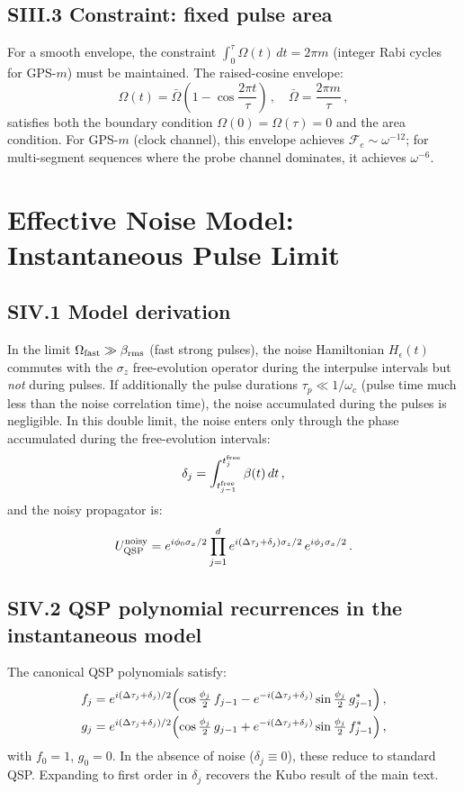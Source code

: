 \documentclass[aps,pra,twocolumn,superscriptaddress,longbibliography]{revtex4-2}
\newcommand{\be}{\begin{equation}}
\newcommand{\ee}{\end{equation}}
\begin{document}
\subsection*{SIII.3 Constraint: fixed pulse area}

For a smooth envelope, the constraint $\int_0^{\tau}\Omega(t)\,dt = 2\pi m$ (integer
Rabi cycles for GPS-$m$) must be maintained.  The raised-cosine envelope:
\be
  \Omega(t) = \bar\Omega\left(1 - \cos\frac{2\pi t}{\tau}\right)\,,\quad
  \bar\Omega = \frac{2\pi m}{\tau}\,,
\ee
satisfies both the boundary condition $\Omega(0)=\Omega(\tau)=0$ and the area condition.
For GPS-$m$ (clock channel), this envelope achieves $\mathcal{F}_e\sim\omega^{-12}$;
for multi-segment sequences where the probe channel dominates, it achieves $\omega^{-6}$.


\section{Effective Noise Model: Instantaneous Pulse Limit}
\label{supp:effective_model}

\subsection*{SIV.1 Model derivation}

In the limit $\Omega_{\rm fast} \gg \beta_{\rm rms}$ (fast strong pulses), the noise Hamiltonian
$H_\epsilon(t)$ commutes with the $\sigma_z$ free-evolution operator during the
interpulse intervals but \emph{not} during pulses.
If additionally the pulse durations $\tau_p \ll 1/\omega_c$ (pulse time much less than
the noise correlation time), the noise accumulated during the pulses is negligible.
In this double limit, the noise enters only through the phase accumulated during the
free-evolution intervals:
\be
  \delta_j = \int_{t_{j-1}^{\rm free}}^{t_j^{\rm free}} \beta(t)\,dt\,,
\ee
and the noisy propagator is:
\be
  U_{\rm QSP}^{\rm noisy} = e^{i\phi_0\sigma_x/2}\prod_{j=1}^d
    e^{i(\Delta\tau_j + \delta_j)\sigma_z/2}\,e^{i\phi_j\sigma_x/2}\,.
\ee

\subsection*{SIV.2 QSP polynomial recurrences in the instantaneous model}

The canonical QSP polynomials satisfy:
\begin{align}
  f_j &= e^{i(\Delta\tau_j+\delta_j)/2}\Bigl(\cos\tfrac{\phi_j}{2}\,f_{j-1}
         - e^{-i(\Delta\tau_j+\delta_j)}\sin\tfrac{\phi_j}{2}\,g_{j-1}^*\Bigr)\,, \\
  g_j &= e^{i(\Delta\tau_j+\delta_j)/2}\Bigl(\cos\tfrac{\phi_j}{2}\,g_{j-1}
         + e^{-i(\Delta\tau_j+\delta_j)}\sin\tfrac{\phi_j}{2}\,f_{j-1}^*\Bigr)\,,
\end{align}
with $f_0 = 1$, $g_0 = 0$.
In the absence of noise ($\delta_j \equiv 0$), these reduce to standard QSP.
Expanding to first order in $\delta_j$ recovers the Kubo result of the main text.
\end{document}
